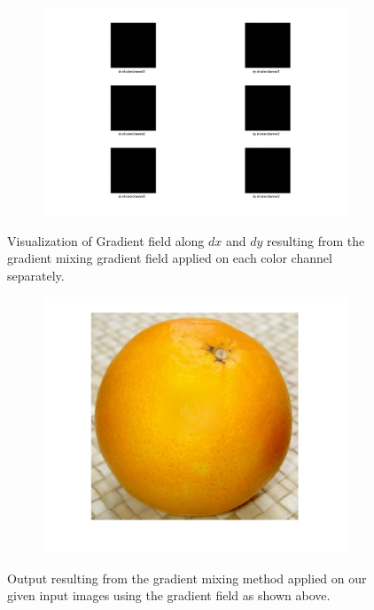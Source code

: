 \documentclass{paper}
\begin{document}
\begin{figure}[H]
    \centering
    \begin{subfigure}{1.0\textwidth}
        \includegraphics[width=\textwidth]{../../outputs/p4/highlight_removal/gradients4colorchannels}
    \end{subfigure}
    \caption{Visualization of Gradient field along $dx$ and $dy$ resulting from the gradient mixing gradient field applied on each color channel separately.}
    \label{fig:highlight_removal_gradients}       
\end{figure}


\begin{figure}[H]
    \centering
    \begin{subfigure}{1.0\textwidth}
        \includegraphics[width=\textwidth]{../../outputs/p4/highlight_removal/output_alphacompression}
    \end{subfigure}
    \caption{Output resulting from the gradient mixing method applied on our given input images using the gradient field as shown above.}
    \label{fig:highlight_removal_out_alphacompression}       
\end{figure}
\end{document}
